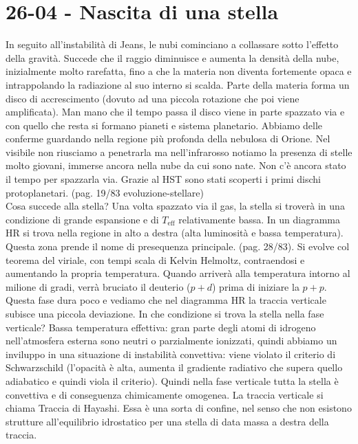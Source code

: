 \section*{26-04 - Nascita di una stella}
In seguito all'instabilità di Jeans, le nubi cominciano a collassare sotto l'effetto della gravità. Succede che il raggio diminuisce e aumenta la densità della nube, inizialmente molto rarefatta, fino a che la materia non diventa fortemente opaca e intrappolando la radiazione al suo interno si scalda. Parte della materia forma un disco di accrescimento (dovuto ad una piccola rotazione che poi viene amplificata). Man mano che il tempo passa il disco viene in parte spazzato via e con quello che resta si formano pianeti e sistema planetario. Abbiamo delle conferme guardando nella regione più profonda della nebulosa di Orione. Nel visibile non riusciamo a penetrarla ma nell'infrarosso notiamo la presenza di stelle molto giovani, immerse ancora nella nube da cui sono nate. Non c'è ancora stato il tempo per spazzarla via. Grazie al HST sono stati scoperti i primi dischi protoplanetari. (pag. 19/83 evoluzione-stellare) \\
Cosa succede alla stella? Una volta spazzato via il gas, la stella si troverà in una condizione di grande espansione e di $T_{\text{eff}}$ relativamente bassa. In un diagramma HR si trova nella regione in alto a destra (alta luminosità e bassa temperatura). Questa zona prende il nome di presequenza principale. (pag. 28/83). Si evolve col teorema del viriale, con tempi scala di Kelvin Helmoltz, contraendosi e aumentando la propria temperatura. Quando arriverà alla temperatura intorno al milione di gradi, verrà bruciato il deuterio ($p+d$) prima di iniziare la $p+p$. Questa fase dura poco e vediamo che nel diagramma HR la traccia verticale subisce una piccola deviazione. In che condizione si trova la stella nella fase verticale? Bassa temperatura effettiva: gran parte degli atomi di idrogeno nell'atmosfera esterna sono neutri o parzialmente ionizzati, quindi abbiamo un inviluppo in una situazione di instabilità convettiva: viene violato il criterio di Schwarzschild (l'opacità è alta, aumenta il gradiente radiativo che supera quello adiabatico e quindi viola il criterio). Quindi nella fase verticale tutta la stella è convettiva e di conseguenza chimicamente omogenea. La traccia verticale si chiama Traccia di Hayashi. Essa è una sorta di confine, nel senso che non esistono strutture all'equilibrio idrostatico per una stella di data massa a destra della traccia. \\
